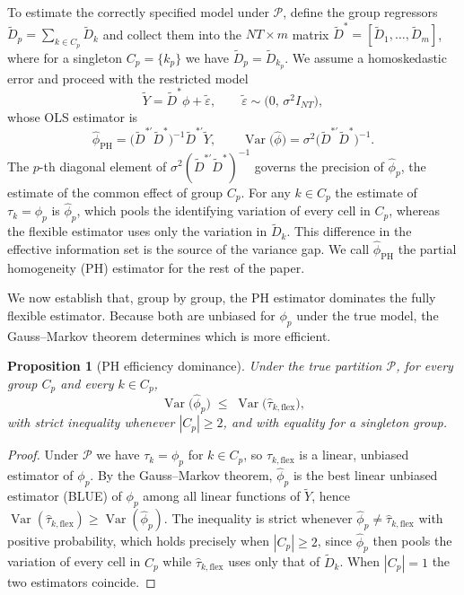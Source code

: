 \documentclass[margin=5in, 12pt]{article}
\newtheorem{proposition}{Proposition}
\DeclareMathOperator{\Var}{Var}
\newcommand{\1}{\mathbbm{1}}
\newcommand{\Dtd}{\tilde{D}}
\begin{document}
To estimate the correctly specified model under $\mathcal{P}$, define the group
regressors $\Dtd_p = \sum_{k \in C_p} \tilde{D}_{k}$ and collect them into the
$NT \times m$ matrix $\Dtd^* = [\tilde{D}_1, \ldots, \tilde{D}_m]$, where for a
singleton $C_p = \{k_p\}$ we have $\Dtd_p = \tilde{D}_{k_p}$. We assume a
homoskedastic error and proceed with the restricted model
\begin{equation}
  \tilde Y = \Dtd^*\phi + \tilde{\varepsilon},
  \qquad
  \tilde{\varepsilon} \sim \bigl(0,\,\sigma^2 I_{NT}\bigr),
  \label{eq:within}
\end{equation}
whose OLS estimator is
\begin{equation}
  \hat{\phi}_{\text{PH}} = \bigl(\Dtd^{*\prime}\Dtd^*\bigr)^{-1}\Dtd^{*\prime}\tilde Y ,
  \qquad
  \Var\!\bigl(\hat{\phi}\bigr)
  = \sigma^2\bigl(\Dtd^{*\prime}\Dtd^*\bigr)^{-1}.
  \label{eq:oracle_var}
\end{equation}
The $p$-th diagonal element of $\sigma^2(\Dtd^{*\prime}\Dtd^*)^{-1}$ governs the
precision of $\hat\phi_p$, the estimate of the common effect of group $C_p$. For
any $k \in C_p$ the estimate of $\tau_k = \phi_p$ is $\hat\phi_p$, which pools the
identifying variation of every cell in $C_p$, whereas the flexible estimator uses
only the variation in $\tilde{D}_k$. This difference in the effective information
set is the source of the variance gap. We call $\hat{\phi}_{\text{PH}}$ the
partial homogeneity (PH) estimator for the rest of the paper.

We now establish that, group by group, the PH estimator dominates the fully
flexible estimator. Because both are unbiased for $\phi_p$ under the true model,
the Gauss--Markov theorem determines which is more efficient.

\begin{proposition}[PH efficiency dominance]
  \label{prop:oracle_dom}
  Under the true partition $\mathcal{P}$, for every group $C_p$ and every
  $k \in C_p$,
  \begin{equation}
    \Var\!\bigl(\hat\phi_{p}\bigr)
    \;\leq\;
    \Var\!\bigl(\hat\tau_{k,\text{flex}}\bigr),
    \label{eq:var_ineq}
  \end{equation}
  with strict inequality whenever $|C_p| \geq 2$, and with equality for a
  singleton group.
\end{proposition}

\begin{proof}
Under $\mathcal{P}$ we have $\tau_k = \phi_p$ for $k \in C_p$, so
$\hat\tau_{k,\text{flex}}$ is a linear, unbiased estimator of $\phi_p$. By the
Gauss--Markov theorem, $\hat\phi_p$ is the best linear unbiased estimator (BLUE)
of $\phi_p$ among all linear functions of $\tilde Y$, hence
$\Var(\hat\tau_{k,\text{flex}}) \geq \Var(\hat\phi_p)$. The inequality is strict
whenever $\hat\phi_p \neq \hat\tau_{k,\text{flex}}$ with positive probability,
which holds precisely when $|C_p| \geq 2$, since $\hat\phi_p$ then pools the
variation of every cell in $C_p$ while $\hat\tau_{k,\text{flex}}$ uses only that
of $\tilde{D}_k$. When $|C_p| = 1$ the two estimators coincide.
\end{proof}
\end{document}
